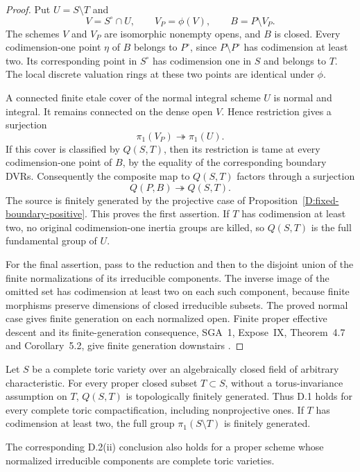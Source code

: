 \begin{proof}
Put $U=S\setminus T$ and
\[
        V=S^\circ\cap U,\qquad V_P=\phi(V),\qquad B=P\setminus V_P.
\]
The schemes $V$ and $V_P$ are isomorphic nonempty opens, and $B$ is
closed. Every codimension-one point $\eta$ of $B$ belongs to
$P^\circ$, since $P\setminus P^\circ$ has codimension at least two.
Its corresponding point in $S^\circ$ has codimension one in $S$ and
belongs to $T$. The local discrete valuation rings at these two
points are identical under $\phi$.

A connected finite etale cover of the normal integral scheme $U$ is
normal and integral. It remains connected on the dense open $V$.
Hence restriction gives a surjection
\[
                     \pi_1(V_P)\twoheadrightarrow\pi_1(U).
\]
If this cover is classified by $Q(S,T)$, then its restriction is
tame at every codimension-one point of $B$, by the equality of
the corresponding boundary DVRs. Consequently the composite map
to $Q(S,T)$ factors through a surjection
\[
                         Q(P,B)\twoheadrightarrow Q(S,T).
                         \tag{D.CP.1}
\]
The source is finitely generated by the projective case of
Proposition~\ref{D:fixed-boundary-positive}. This proves the first
assertion. If $T$ has codimension at least two, no original
codimension-one inertia groups are killed, so $Q(S,T)$ is the full
fundamental group of $U$.

For the final assertion, pass to the reduction and then to the
disjoint union of the finite normalizations of its irreducible
components. The inverse image of the omitted set has codimension
at least two on each such component, because finite morphisms
preserve dimensions of closed irreducible subsets. The proved
normal case gives finite generation on each normalized open.
Finite proper effective descent and its finite-generation
consequence, SGA~1, Expose~IX, Theorem~4.7 and Corollary~5.2,
give finite generation downstairs
\citep[pp.~238--239 and 247--248]{SGA1}.
\end{proof}

\begin{corollary}
\label{D:complete-toric-fixed-boundary}
Let $S$ be a complete toric variety over an algebraically closed field
of arbitrary characteristic. For every proper closed subset
$T\subset S$, without a torus-invariance assumption on $T$,
$Q(S,T)$ is topologically finitely generated. Thus D.1 holds for
every complete toric compactification, including nonprojective ones.
If $T$ has codimension at least two, the full group
$\pi_1(S\setminus T)$ is finitely generated.

The corresponding D.2(ii) conclusion also holds for a proper scheme
whose normalized irreducible components are complete toric varieties.
\end{corollary}

